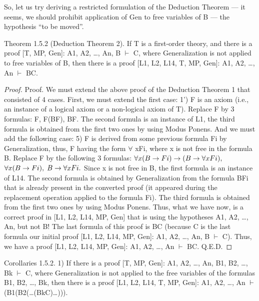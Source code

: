 So, let us try deriving a restricted formulation of the Deduction Theorem --- it seems, we should prohibit
application of Gen to free variables of B --- the hypothesis ``to be moved''.

\begin{theorem}
Theorem 1.5.2 (Deduction Theorem 2). If T is a first-order theory, and there is a proof [T, MP, Gen]: A1, A2, \ldots , An, B \(\vdash\) C, where Generalization is not applied to free variables of B, then there is a proof [L1, L2, L14, T, MP, Gen]: A1, A2, \ldots , An \(\vdash\) B\IMPLIES C.
\end{theorem}

\begin{proof}
Proof. We must extend the above proof of the Deduction Theorem 1 that consisted of 4 cases. First, we
must extend the first case:
1') F is an axiom (i.e., an instance of a logical axiom or a non-logical axiom of T). Replace F by 3
formulas: F, F\IMPLIES (B\IMPLIES F), B\IMPLIES F. The second formula is an instance of L1, the third formula is obtained
from the first two ones by using Modus Ponens.
And we must add the following case:
5) F is derived from some previous formula Fi by Generalization, thus, F having the form \(\forall\) xFi, where x
is not free in the formula B. Replace F by the following 3 formulas:
\(\forall x(B\rightarrow Fi)\rightarrow (B\rightarrow \forall xFi),\)
\(\forall x(B\rightarrow Fi),\)
\(B\rightarrow \forall xFi.\)
Since x is not free in B, the first formula is an instance of L14. The second formula is obtained by
Generalization from the formula B\IMPLIES Fi that is already present in the converted proof (it appeared during
the replacement operation applied to the formula Fi). The third formula is obtained from the first two ones
by using Modus Ponens.
Thus, what we have now, is a correct proof in [L1, L2, L14, MP, Gen] that is using the hypotheses A1,
A2, \ldots , An, but not B! The last formula of this proof is B\IMPLIES C (because C is the last formula our initial
proof [L1, L2, L14, MP, Gen]: A1, A2, \ldots , An, B \(\vdash\) C). Thus, we have a proof [L1, L2, L14, MP, Gen]: A1,
A2, \ldots , An \(\vdash\) B\IMPLIES C. Q.E.D.
\end{proof}

\begin{corollary}

Corollaries 1.5.2. 1) If there is a proof [T, MP, Gen]: A1, A2, \ldots , An, B1, B2, \ldots , Bk \(\vdash\) C, where
Generalization is not applied to the free variables of the formulas B1, B2, \ldots , Bk, then there is a proof [L1,
L2, L14, T, MP, Gen]: A1, A2, \ldots , An \(\vdash\) (B1\IMPLIES (B2\IMPLIES (\ldots \IMPLIES (Bk\IMPLIES C)\ldots ))).
\end{corollary}

